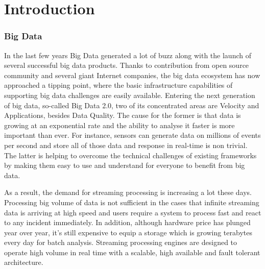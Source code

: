
\chapter{Introduction}

\ifpdf
    \graphicspath{{Chapter1/Figs/Raster/}{Chapter1/Figs/PDF/}{Chapter1/Figs/}}
\else
    \graphicspath{{Chapter1/Figs/Vector/}{Chapter1/Figs/}}
\fi


\subsection*{Big Data}
In the last few years Big Data generated a lot of buzz along with the launch of several successful big data products. Thanks to contribution from open source community and several giant Internet companies, the big data ecosystem has now approached a tipping point, where the basic infrastructure capabilities of supporting big data challenges are easily available. Entering the next generation of big data, so-called Big Data 2.0, two of its concentrated areas are Velocity and Applications, besides Data Quality. The cause for the former is that data is growing at an exponential rate and the ability to analyse it faster is more important than ever. For instance, sensors can generate data on millions of events per second and store all of those data and response in real-time is non trivial. The latter is helping to overcome the technical challenges of existing frameworks by making them easy to use and understand for everyone to benefit from big data.

As a result, the demand for streaming processing is increasing a lot these days. Processing big volume of data is not sufficient in the cases that infinite streaming data is arriving at high speed and users require a system to process fast and react to any incident immediately. In addition, although hardware price has plunged year over year, it’s still expensive to equip a storage which is growing terabytes every day for batch analysis.  Streaming processing engines are designed to operate high volume in real time with a scalable, high available and fault tolerant architecture.




